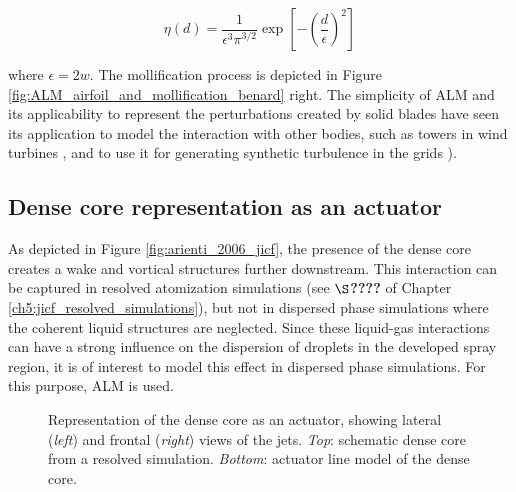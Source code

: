 \begin{equation}
\eta \left( d \right) = \frac{1}{\epsilon^3 \pi^{3/2}} \exp \left[ - \left( \frac{d}{\epsilon} \right)^2 \right]
\end{equation}

where $\epsilon = 2 w$. The mollification process is depicted in Figure \ref{fig:ALM_airfoil_and_mollification_benard} right. The simplicity of ALM and its applicability to represent the perturbations created by solid blades have seen its application to model the interaction with other bodies, such as towers in wind turbines , and to use it for generating synthetic turbulence in the grids ).



\subsection{Dense core representation as an actuator}


As depicted in Figure \ref{fig:arienti_2006_jicf}, the presence of the dense core creates a wake and vortical structures further downstream. This interaction can be captured in resolved atomization simulations (see $\S$\textbf{????} of Chapter \ref{ch5:jicf_resolved_simulations}), but not in dispersed phase simulations where the coherent liquid structures are neglected. Since these liquid-gas interactions can have a strong influence on the dispersion of droplets in the developed spray region, it is of interest to model this effect in dispersed phase simulations. For this purpose, ALM is used.

\begin{figure}[h!]	
	\centering
	\caption[Representation of the dense core as an actuator]{Representation of the dense core as an actuator, showing lateral (\textsl{left}) and frontal (\textsl{right}) views of the jets. \textsl{Top}: schematic dense core from a resolved simulation. \textsl{Bottom}: actuator line model of the dense core.}
	\label{fig:ALM_DC_learning}
\end{figure}

